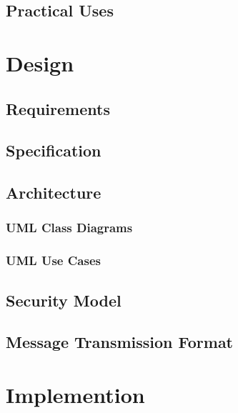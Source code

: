 \documentclass[a4paper,12pt]{report}
\begin{document}


\section{Practical Uses}



\chapter{Design}

\section{Requirements}



\section{Specification}



\section{Architecture}



\subsection{UML Class Diagrams}

\subsection{UML Use Cases}



\section{Security Model}

\section{Message Transmission Format}



\chapter{Implemention}
\end{document}
